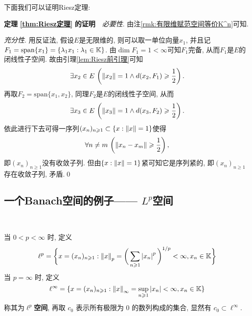 	下面我们可以证明Riesz定理:
	
	\textbf{定理\,\,\ref{thm:Riesz定理}\,\,的证明}\ \ \textsl{必要性}. 由注\ref{rmk:有限维赋范空间等价K^n}可知.
	
	\textsl{充分性}. 用反证法, 假设$ E $是无限维的, 则可以取一单位向量$ x_1 $, 并且记$ F_1=\mathrm{span}\{x_1\}=\{ \lambda_1x_1 : \lambda_1\in\mathbb{K} \} $. 由$ \dim F_1=1<\infty $可知$ F_1 $完备, 从而$ F_1 $是$ E $的闭线性子空间. 故由引理\ref{lem:Riesz前引理}可知
	\[
	\exists x_2\in E\,\left(\left\| x_2 \right\|=1\land d(x_2,F_1)\geqslant\frac{1}{2}\right).
	\]
	再取$ F_2=\mathrm{span}\{x_1,x_2\} $, 同理$ F_2 $是$ E $的闭线性子空间, 从而
	\[
	\exists x_3\in E\,\left(\left\| x_3 \right\|=1\land d(x_3,F_2)\geqslant\frac{1}{2}\right).
	\]
	依此进行下去可得一序列$ (x_n)_{n\geqslant 1}\subset\{ x : \left\| x \right\|=1 \} $使得
	\[
	\forall n\ne m\,\left(\left\| x_n-x_m \right\|\geqslant\frac{1}{2}\right),
	\]
	即$ (x_n)_{n\geqslant 1} $没有收敛子列. 但由$ \{ x : \left\| x \right\|=1 \} $紧可知它是序列紧的, 即$ (x_n)_{n\geqslant 1} $存在收敛子列, 矛盾.\qed
	
     \subsection{一个Banach空间的例子—— $ L^p $空间}
     
     \begin{Definition}[$ \ell^{p} $空间]\label{def:lp空间}~

          当 $ 0<p<\infty $ 时, 定义
          \[
               \ell^{p}=\bigg\{ x=(x_{n})_{n\geqslant1}: \left\| x \right\|_{p}=\bigg( \sum\limits_{n\geqslant1}\left| x_{n} \right| ^{p} \bigg)^{1/p}<\infty, x_{n}\in\mathbb{K} \bigg\}
          \]
           当 $ p=\infty $ 时, 定义
           \[
                \ell^{\infty}=\{ x=(x_{n})_{n\geqslant1}:\left\| x \right\|_{\infty}=\sup_{n\geqslant1}\left| x_{n} \right| <\infty, x_{n}\in\mathbb{K} \}
           \]
           称其为\textbf{$ \ell^{p} $空间}, 再取 $ c_{0} $ 表示所有极限为 $ 0 $ 的数列构成的集合, 显然有 $ c_{0}\subset\ell^{\infty} $. 
     \end{Definition}
	
	